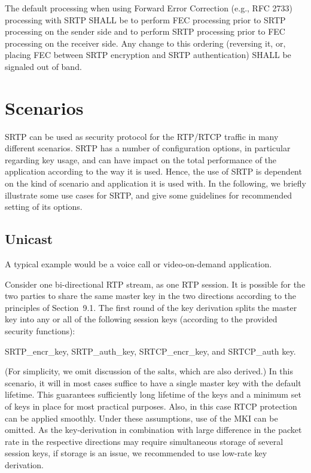 \documentclass{article}
\begin{document}
The default processing when using Forward Error Correction (e.g., RFC 2733) processing with SRTP SHALL be to perform FEC processing prior to SRTP processing on the sender side and to perform SRTP processing prior to FEC processing on the receiver side.  Any change to this ordering (reversing it, or, placing FEC between SRTP encryption and SRTP authentication) SHALL be signaled out of band.

\section{Scenarios}

SRTP can be used as security protocol for the RTP/RTCP traffic in many different scenarios.  SRTP has a number of configuration options, in particular regarding key usage, and can have impact on the total performance of the application according to the way it is used.  Hence, the use of SRTP is dependent on the kind of scenario and application it is used with.  In the following, we briefly illustrate some use cases for SRTP, and give some guidelines for recommended setting of its options.

\subsection{Unicast}

A typical example would be a voice call or video-on-demand application.

Consider one bi-directional RTP stream, as one RTP session.  It is possible for the two parties to share the same master key in the two directions according to the principles of Section~9.1.  The first round of the key derivation splits the master key into any or all of the following session keys (according to the provided security functions):

SRTP\_encr\_key, SRTP\_auth\_key, SRTCP\_encr\_key, and SRTCP\_auth key.

(For simplicity, we omit discussion of the salts, which are also derived.)  In this scenario, it will in most cases suffice to have a single master key with the default lifetime.  This guarantees sufficiently long lifetime of the keys and a minimum set of keys in place for most practical purposes.  Also, in this case RTCP protection can be applied smoothly.  Under these assumptions, use of the MKI can be omitted.  As the key-derivation in combination with large difference in the packet rate in the respective directions may require simultaneous storage of several session keys, if storage is an issue, we recommended to use low-rate key derivation.
\end{document}

